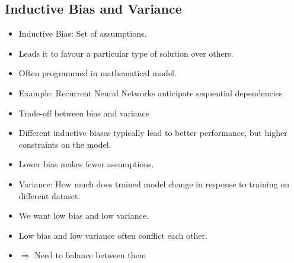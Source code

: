 \subsection{Inductive Bias and Variance}
\label{subsec:concepts-bias-variance}
\begin{frame}{\insertsubsection}
    \begin{itemize}[<+->]
        \item Inductive Bias: Set of assumptions.
        \item[] Leads it to favour a particular type of solution over others.
        \item[] Often programmed in mathematical model.
        \item[] Example: Recurrent Neural Networks anticipate sequential dependencies
        \item Trade-off between bias and variance
        \item[] Different inductive biases typically lead to better performance, but higher constraints on the model.
        \item[] Lower bias makes fewer assumptions.
        \item Variance: How much does trained model change in response to training on different dataset.
        \item We want low bias and low variance.
        \item Low bias and low variance often conflict each other.
        \item[]$\Rightarrow$ Need to balance between them
    \end{itemize}
\end{frame}